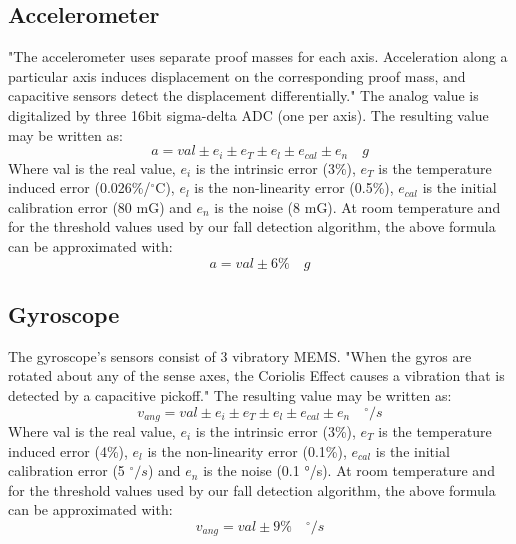 \documentclass[conference,12pt]{IEEETran}
\begin{document}
\subsection{Accelerometer}
"The accelerometer uses separate proof masses for each axis. Acceleration along a particular axis induces displacement on the corresponding proof mass, and capacitive sensors detect the displacement differentially." The analog value is digitalized by three 16bit sigma-delta ADC (one per axis). The resulting value may be written as:
$$ a = val \pm e_i \pm e_T \pm e_l \pm e_{cal} \pm e_n \quad g $$
Where val is the real value, $e_i$ is the intrinsic error (3\%), $e_T$ is the temperature induced error (0.026\%/$^{\circ}$C), $e_l$ is the non-linearity error (0.5\%), $e_{cal}$ is the initial calibration error (80 mG) and $e_n$ is the noise (8 mG). At room temperature and for the threshold values used by our fall detection algorithm, the above formula can be approximated with:
$$ a = val \pm 6\%  \quad g $$

\subsection{Gyroscope}
The gyroscope’s sensors consist of 3 vibratory MEMS. "When the gyros are rotated about any of the sense axes, the Coriolis Effect causes a vibration that is detected by a capacitive pickoff." The resulting value may be written as:
$$ v_{ang} = val \pm e_i  \pm e_T \pm e_l \pm e_{cal} \pm e_n \quad ^{\circ}/s $$
Where val is the real value, $e_i$ is the intrinsic error (3\%), $e_T$ is the temperature induced error (4\%), $e_l$ is the non-linearity error (0.1\%), $e_{cal}$ is the initial calibration error (5 $^{\circ}/s$) and $e_n$ is the noise (0.1 °/s). At room temperature and for the threshold values used by our fall detection algorithm, the above formula can be approximated with:
$$ v_{ang} = val \pm 9\% \quad ^{\circ}/s $$
\end{document}

